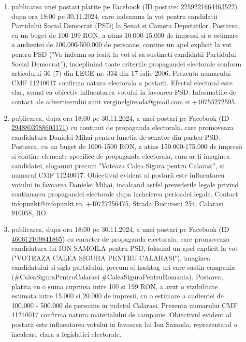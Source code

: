 \documentclass[a4paper,12pt]{article}
\begin{document}
\begin{enumerate}[leftmargin=*, label=\arabic*.)]
    \item publicarea unei postari platite pe Facebook (ID postare: \href{https://www.facebook.com/ads/library/?id=2259221664463522}{2259221664463522}) dupa ora 18:00 pe 30.11.2024, care indeamna la vot pentru candidatii Partidului Social Democrat (PSD) la Senat si Camera Deputatilor. Postarea, cu un buget de 100-199 RON, a atins 10.000-15.000 de impresii si o estimare a audientei de 100.000-500.000 de persoane, contine un apel explicit la vot pentru PSD ("Va indemn sa iesiti la vot si sa sustineti candidatii Partidului Social Democrat"), indeplinind toate criteriile propagandei electorale conform articolului 36 (7) din LEGE nr. 334 din 17 iulie 2006. Prezenta numarului CMF 11240017 confirma natura electorala a postarii.  Efectul electoral este clar, avand ca obiectiv influentarea votului in favoarea PSD.  Informatiile de contact ale advertiserului sunt verginelgireada@gmail.com si +40755272595.
    \item publicarea, dupa ora 18:00 pe 30.11.2024, a unei postari pe Facebook (ID \href{https://www.facebook.com/ads/library/?id=2948803988603171}{2948803988603171}) cu continut de propaganda electorala, care promoveaza candidatura Danielei Mihai pentru functia de senator din partea PSD. Postarea, cu un buget de 1000-1500 RON, a atins 150.000-175.000 de impresii si contine elemente specifice de propaganda electorala, cum ar fi imaginea candidatei, sloganuri precum "Voteaza Calea Sigura pentru Calarasi", si numarul CMF 11240017. Obiectivul evident al postarii este influentarea votului in favoarea Danielei Mihai, incalcand astfel prevederile legale privind continuarea propagandei electorale dupa incheierea perioadei legale.  Contact: infopunkt@infopunkt.ro, +40727256475, Strada Bucuresti 254, Calarasi 910058, RO.
    \item publicarea, dupa ora 18:00 pe 30.11.2024, a unei postari pe Facebook (ID \href{https://www.facebook.com/ads/library/?id=460612109841865}{460612109841865}) cu caracter de propaganda electorala, care promoveaza candidatura lui ION SAMOILA pentru PSD, folosind un apel explicit la vot ("VOTEAZA CALEA SIGURA PENTRU CALARASI"), imaginea candidatului si sigla partidului, precum si hashtag-uri care sustin campania (\#CaleaSiguraPentruCalarasi \#CaleaSiguraPentruRomania). Postarea, platita cu o suma cuprinsa intre 100 si 199 RON, a avut o vizibilitate estimata intre 15.000 si 20.000 de impresii, cu o estimare a audientei de 100.000 - 500.000 de persoane in judetul Calarasi. Prezenta numarului CMF 11240017 confirma natura materialului de campanie. Obiectivul evident al postarii este influentarea votului in favoarea lui Ion Samoila, reprezentand o incalcare clara a legislatiei electorale.

\end{enumerate}
\end{document}
